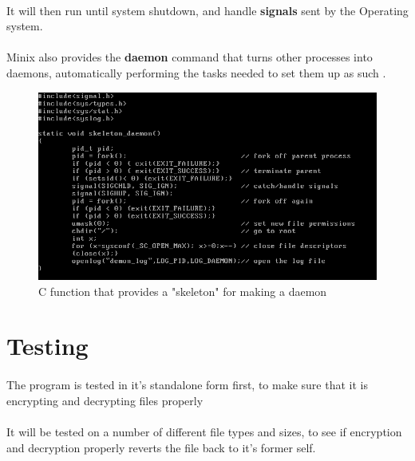 \documentclass{article}
\begin{document}
        \paragraph{}It will then run until system shutdown, and handle \textbf{signals} sent by the Operating system.
        \paragraph{}Minix also provides the \textbf{daemon} command that turns other processes into daemons, automatically performing the tasks needed to set them up as such \parencite{daemon_command_minix}.

        \begin{figure}[htbp]
            \centering
            \includegraphics[width=\textwidth]{daemon_code_screenshot_1.png}
            \caption{C function that provides a "skeleton" for making a daemon}
            \label{fig:my_label}
        \end{figure}
    
\section{Testing}
    \paragraph{}The program is tested in it's standalone form first, to make sure that it is encrypting and decrypting files properly
    \paragraph{}It will be tested on a number of different file types and sizes, to see if encryption and decryption properly reverts the file back to it's former self.
\end{document}
